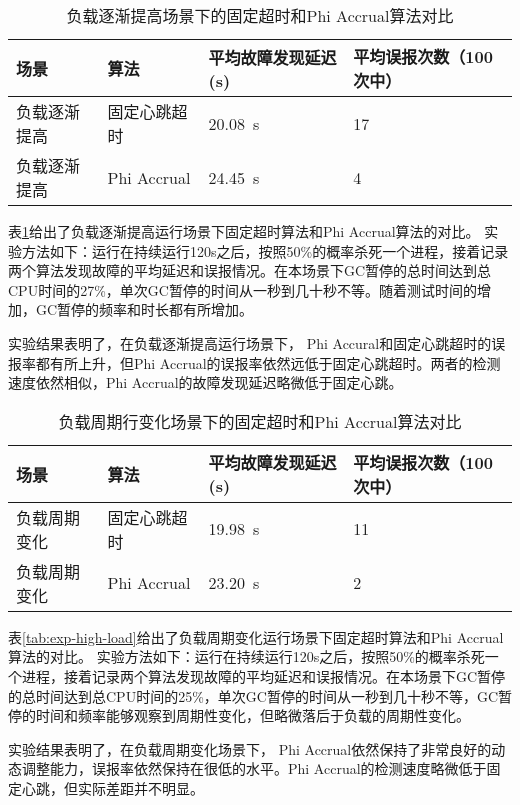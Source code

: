 \begin{table}[h!]
    \centering
    \caption{负载逐渐提高场景下的固定超时和Phi Accrual算法对比}
    \label{tab:exp-increase-load}
    \begin{tabular}{@{}llll@{}}
        \toprule
        场景 & 算法 & 平均故障发现延迟 (s) & 平均误报次数（100次中） \\
        \midrule
        负载逐渐提高 & 固定心跳超时 & \SI{20.08}{\second} & 17 \\
        负载逐渐提高 & Phi Accrual & \SI{24.45}{\second} & 4 \\
        \bottomrule
    \end{tabular}
\end{table}

表\ref{tab:exp-increase-load}给出了负载逐渐提高运行场景下固定超时算法和Phi Accrual算法的对比。
实验方法如下：运行在持续运行120s之后，按照50\%的概率杀死一个进程，接着记录两个算法发现故障的平均延迟和误报情况。在本场景下GC暂停的总时间达到总CPU时间的27\%，单次GC暂停的时间从一秒到几十秒不等。随着测试时间的增加，GC暂停的频率和时长都有所增加。

实验结果表明了，在负载逐渐提高运行场景下，
Phi Accural和固定心跳超时的误报率都有所上升，但Phi Accrual的误报率依然远低于固定心跳超时。两者的检测速度依然相似，Phi Accrual的故障发现延迟略微低于固定心跳。


\begin{table}[h!]
    \centering
    \caption{负载周期行变化场景下的固定超时和Phi Accrual算法对比}
    \label{tab:exp-seasonal-load}
    \begin{tabular}{@{}llll@{}}
        \toprule
        场景 & 算法 & 平均故障发现延迟 (s) & 平均误报次数（100次中） \\
        \midrule
        负载周期变化 & 固定心跳超时 & \SI{19.98}{\second} & 11 \\
        负载周期变化 & Phi Accrual & \SI{23.20}{\second} & 2 \\
        \bottomrule
    \end{tabular}
\end{table}

表\ref{tab:exp-high-load}给出了负载周期变化运行场景下固定超时算法和Phi Accrual算法的对比。
实验方法如下：运行在持续运行120s之后，按照50\%的概率杀死一个进程，接着记录两个算法发现故障的平均延迟和误报情况。在本场景下GC暂停的总时间达到总CPU时间的25\%，单次GC暂停的时间从一秒到几十秒不等，GC暂停的时间和频率能够观察到周期性变化，但略微落后于负载的周期性变化。

实验结果表明了，在负载周期变化场景下，
Phi Accrual依然保持了非常良好的动态调整能力，误报率依然保持在很低的水平。Phi Accrual的检测速度略微低于固定心跳，但实际差距并不明显。

